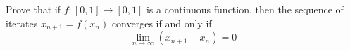 Prove that if $f:[0,1]\rightarrow[0,1]$ is a continuous function, then the sequence of iterates $x_{n+1}=f(x_{n})$ converges if and only if
$$\lim_{n\to \infty}(x_{n+1}-x_{n})=0$$